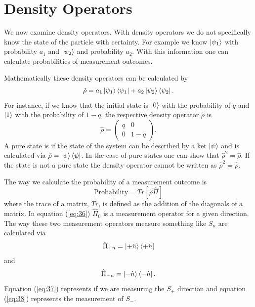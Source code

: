 \documentclass[twocolumn]{article}
\begin{document}
\section*{Density Operators}
We now examine density operators. With density operators we do not specifically know the state of the particle with certainty. For example we know $\ket{\psi_1}$ with probability $a_1$ and $\ket{\psi_2}$ and probability $a_2$. With this information one can calculate probabilities of measurement outcomes. 

Mathematically these density operators can be calculated by
\begin{equation} \label{eq:34}
\hat{\rho}=a_1\ket{\psi_1}\bra{\psi_1}+a_2\ket{\psi_2}\bra{\psi_2}.
\end{equation}
For instance, if we know that the initial state is $\ket{0}$ with the probability of $q$ and $\ket{1}$ with the probability of $1-q$, the respective density operator $\hat{\rho}$ is
\begin{equation} \label{eq:35}
\hat{\rho}=
\begin{pmatrix}
q & 0 \\
0 & 1-q
\end{pmatrix}.
\end{equation}
A pure state is if the state of the system can be described by a ket $\ket{\psi}$ and is calculated via $\hat{\rho}=\ket{\psi}\bra{\psi}$. In the case of pure states one can show that $\hat{\rho}^2=\hat{\rho}$. If the state is not a pure state the density operator cannot be written as $\hat{\rho}^2=\hat{\rho}$. 

The way we calculate the probability of a measurement outcome is
\begin{equation} \label{eq:36}
\text{Probability}=Tr[\hat{\rho}\hat{\Pi}]
\end{equation}
where the trace of a matrix, $Tr$, is defined as the addition of the diagonals of a matrix. In equation (\ref{eq:36}) $\hat{\Pi}_0$ is a measurement operator for a given direction. The way these two measurement operators measure something like $S_n$ are calculated via
\begin{equation}\label{eq:37}
\hat{\Pi}_{+n}=\ket{+\hat{n}}\bra{+\hat{n}}
\end{equation}
and
\begin{equation}\label{eq:38}
\hat{\Pi}_{-n}=\ket{-\hat{n}}\bra{-\hat{n}}.
\end{equation}
Equation (\ref{eq:37}) represents if we are measuring the $S_+$ direction and equation (\ref{eq:38}) represents the measurement of $S_-$.
\end{document}
